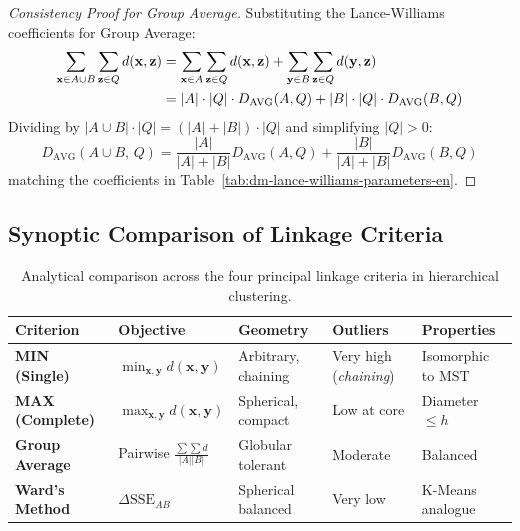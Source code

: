 \begin{proof}[Consistency Proof for Group Average]
Substituting the Lance-Williams coefficients for Group Average:
\begin{align}
    \sum_{\mathbf{x} \in A \cup B} \sum_{\mathbf{z} \in Q} d(\mathbf{x}, \mathbf{z}) &= \sum_{\mathbf{x} \in A} \sum_{\mathbf{z} \in Q} d(\mathbf{x}, \mathbf{z}) + \sum_{\mathbf{y} \in B} \sum_{\mathbf{z} \in Q} d(\mathbf{y}, \mathbf{z}) \notag \\
    &= |A| \cdot |Q| \cdot D_{\text{AVG}}(A, Q) + |B| \cdot |Q| \cdot D_{\text{AVG}}(B, Q)
\end{align}
Dividing by $|A \cup B| \cdot |Q| = (|A| + |B|) \cdot |Q|$ and simplifying $|Q| > 0$:
\begin{equation}
    D_{\text{AVG}}(A \cup B, \, Q) = \frac{|A|}{|A| + |B|} D_{\text{AVG}}(A, Q) + \frac{|B|}{|A| + |B|} D_{\text{AVG}}(B, Q)
\end{equation}
matching the coefficients in Table~\ref{tab:dm-lance-williams-parameters-en}.
\end{proof}

\subsection{Synoptic Comparison of Linkage Criteria}

\begin{table}[htbp]
\centering
\footnotesize
\renewcommand{\arraystretch}{1.25}
\begin{tabularx}{\textwidth}{p{2.3cm} p{2.2cm} Y Y Y}
\toprule
\textbf{Criterion} & \textbf{Objective} & \textbf{Geometry} & \textbf{Outliers} & \textbf{Properties} \\
\midrule
\textbf{MIN (Single)} & $\min_{\mathbf{x}, \mathbf{y}} d(\mathbf{x}, \mathbf{y})$ & Arbitrary, chaining & Very high (\textit{chaining}) & Isomorphic to $\mathrm{MST}$ \\
\textbf{MAX (Complete)} & $\max_{\mathbf{x}, \mathbf{y}} d(\mathbf{x}, \mathbf{y})$ & Spherical, compact & Low at core & Diameter $\le h$ \\
\textbf{Group Average} & Pairwise $\frac{\sum \sum d}{|A||B|}$ & Globular tolerant & Moderate & Balanced \\
\textbf{Ward's Method} & $\Delta\mathrm{SSE}_{AB}$ & Spherical balanced & Very low & K-Means analogue \\
\bottomrule
\end{tabularx}
\caption{Analytical comparison across the four principal linkage criteria in hierarchical clustering.}
\label{tab:dm-linkage-criteria-synoptic-en}
\end{table}

